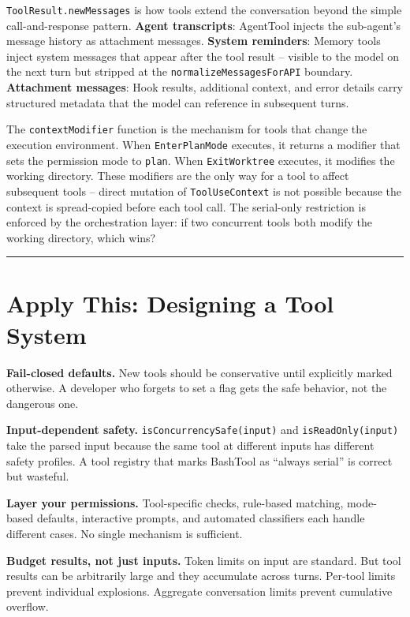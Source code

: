 \documentclass[
  english,
  11pt,
  letterpaper,
]{book}
\begin{document}
\texttt{ToolResult.newMessages} is how tools extend the conversation
beyond the simple call-and-response pattern. \textbf{Agent transcripts}:
AgentTool injects the sub-agent's message history as attachment
messages. \textbf{System reminders}: Memory tools inject system messages
that appear after the tool result -- visible to the model on the next
turn but stripped at the \texttt{normalizeMessagesForAPI} boundary.
\textbf{Attachment messages}: Hook results, additional context, and
error details carry structured metadata that the model can reference in
subsequent turns.

The \texttt{contextModifier} function is the mechanism for tools that
change the execution environment. When \texttt{EnterPlanMode} executes,
it returns a modifier that sets the permission mode to
\texttt{\textquotesingle{}plan\textquotesingle{}}. When
\texttt{ExitWorktree} executes, it modifies the working directory. These
modifiers are the only way for a tool to affect subsequent tools --
direct mutation of \texttt{ToolUseContext} is not possible because the
context is spread-copied before each tool call. The serial-only
restriction is enforced by the orchestration layer: if two concurrent
tools both modify the working directory, which wins?

\begin{center}\rule{0.5\linewidth}{0.5pt}\end{center}

\section{Apply This: Designing a Tool
System}\label{apply-this-designing-a-tool-system}

\textbf{Fail-closed defaults.} New tools should be conservative until
explicitly marked otherwise. A developer who forgets to set a flag gets
the safe behavior, not the dangerous one.

\textbf{Input-dependent safety.} \texttt{isConcurrencySafe(input)} and
\texttt{isReadOnly(input)} take the parsed input because the same tool
at different inputs has different safety profiles. A tool registry that
marks BashTool as ``always serial'' is correct but wasteful.

\textbf{Layer your permissions.} Tool-specific checks, rule-based
matching, mode-based defaults, interactive prompts, and automated
classifiers each handle different cases. No single mechanism is
sufficient.

\textbf{Budget results, not just inputs.} Token limits on input are
standard. But tool results can be arbitrarily large and they accumulate
across turns. Per-tool limits prevent individual explosions. Aggregate
conversation limits prevent cumulative overflow.
\end{document}
